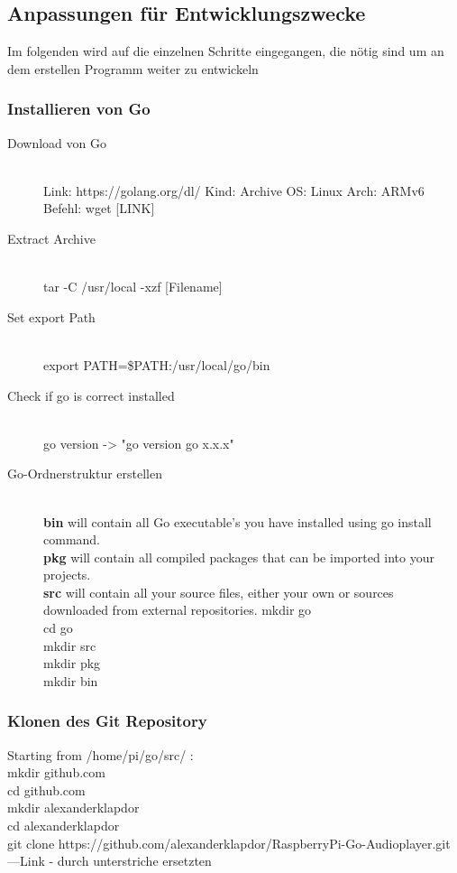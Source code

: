 \subsection{Anpassungen für Entwicklungszwecke}
Im folgenden wird auf die einzelnen Schritte eingegangen, die nötig sind um an dem erstellen Programm weiter zu entwickeln
\subsubsection{Installieren von Go}
\begin{description}
\item[Download von Go] \hfill \\ 
    Link: https://golang.org/dl/ Kind: Archive OS: Linux Arch: ARMv6 Befehl: wget [LINK]
\item[Extract Archive] \hfill \\ 
    tar -C /usr/local -xzf [Filename]
\item[Set export Path] \hfill \\
    export PATH=\$PATH:/usr/local/go/bin
\item[Check if go is correct installed] \hfill \\
    go version -> "go version go x.x.x"
\item[Go-Ordnerstruktur erstellen] \hfill \\
\textbf{bin} will contain all Go executable's you have installed using go install command. \\ 
\textbf{pkg} will contain all compiled packages that can be imported into your projects. 
\\
\textbf{src} will contain all your source files, either your own or sources downloaded from external repositories.
mkdir go \\
cd go \\
mkdir src \\
mkdir pkg \\
mkdir bin \\
\end{description}

\subsubsection{Klonen des Git Repository}
Starting from /home/pi/go/src/ : \\
mkdir github.com \\
cd github.com \\
mkdir alexanderklapdor \\
cd alexanderklapdor \\
git clone https://github.com/alexanderklapdor/RaspberryPi-Go-Audioplayer.git ---Link - durch unterstriche ersetzten


